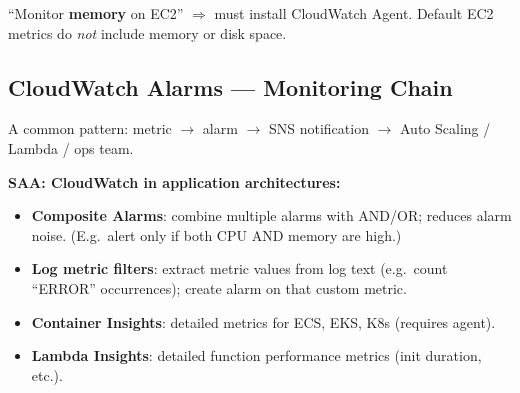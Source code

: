 \begin{examtip}
``Monitor \textbf{memory} on EC2'' $\Rightarrow$ must install CloudWatch Agent.
Default EC2 metrics do \emph{not} include memory or disk space.
\end{examtip}

\subsection{CloudWatch Alarms --- Monitoring Chain}

A common pattern: metric $\rightarrow$ alarm $\rightarrow$ SNS notification $\rightarrow$ Auto Scaling / Lambda / ops team.

\begin{center}
\end{center}

\begin{saadepth}
\textbf{SAA: CloudWatch in application architectures:}
\begin{itemize}
  \item \textbf{Composite Alarms}: combine multiple alarms with AND/OR; reduces alarm noise.
        (E.g.\ alert only if both CPU AND memory are high.)
  \item \textbf{Log metric filters}: extract metric values from log text
        (e.g.\ count ``ERROR'' occurrences); create alarm on that custom metric.
  \item \textbf{Container Insights}: detailed metrics for ECS, EKS, K8s (requires agent).
  \item \textbf{Lambda Insights}: detailed function performance metrics (init duration, etc.).
\end{itemize}
\end{saadepth}

